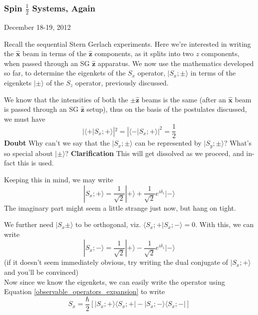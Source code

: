 \documentclass[12pt]{article}
\def\*#1{\boldsymbol{#1}}
\let\oldhat\hat
\renewcommand{\hat}[1]{\oldhat{\*{#1}}}
\def\ket#1{|#1 \rangle}
\def\inpr#1#2{\langle #1|#2 \rangle}
\def\oupr#1#2{| #1 \rangle \langle #2 |}
\begin{document}
			\subsubsection{Spin $\frac 1 2$ Systems, Again}
				\begin{flushright}{\small December 18-19, 2012}\end{flushright}
				Recall the sequential Stern Gerlach experiments. Here we're interested in writing the $\hat x$ beam in terms of the $\hat z$ components, as it splits into two $z$ components, when passed through an SG $\hat z$ apparatus. 
				We now use the mathematics developed so far, to determine the eigenkets of the $S_x$ operator, $\ket {S_x;\pm}$ in terms of the eigenkets $\ket \pm$ of the $S_z$ operator, previously discussed.
				\par
				We know that the intensities of both the $\pm \hat z$ beams is the same (after an $\hat x$ beam is passed through an SG $\hat z$ setup), thus on the basis of the postulates discussed, we must have
				\begin{equation}
					|\inpr{+}{S_x;+}|^2 = |\inpr{-}{S_x;+}|^2 = \frac 1 2
				\end{equation}
				{\bf Doubt} Why can't we say that the $\ket {S_x ; \pm}$ can be represented by $\ket {S_y; \pm}$? What's so special about $\ket {\pm}$?
				{\bf Clarification} This will get dissolved as we proceed, and in-fact this is used.
				\par
				Keeping this in mind, we may write 
				\begin{equation}
					\ket {S_x; +} = \frac 1 {\sqrt 2} \ket + + \frac 1 {\sqrt 2} e^{i\delta_1} \ket {-}
				\end{equation}
				The imaginary part might seem a little strange just now, but hang on tight.
				\par
				We further need $\ket{ S_x \pm}$ to be orthogonal, viz. $\inpr {S_x;+}{S_x;-} = 0$. With this, we can write
				\begin{equation}
					\ket {S_x;-} = \frac 1 {\sqrt 2} \ket + - \frac 1 {\sqrt 2} e^{i\delta_1} \ket {-}
				\end{equation}
				(if it doesn't seem immediately obvious, try writing the dual conjugate of $\ket {S_x;+}$ and you'll be convinced)\\
				Now since we know the eigenkets, we can easily write the operator using Equation \ref{observable_operators_expansion} to write
				\begin{equation}
					S_x =\frac \hbar 2 [ \oupr{S_x;+}{S_x;+} - \oupr{S_x;-}{S_x;-}]
				\end{equation}
\end{document}
